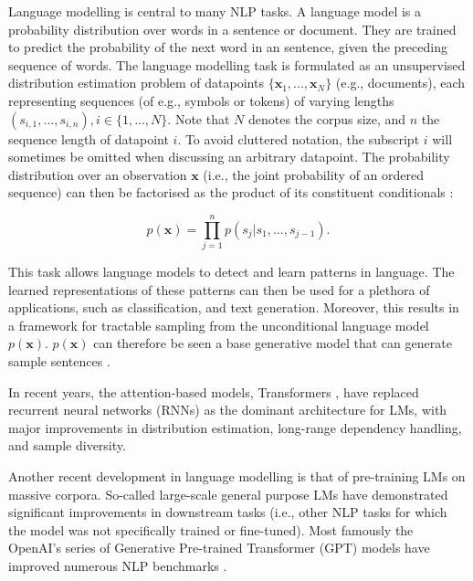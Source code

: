 Language modelling is central to many NLP tasks. A language model is a probability distribution over words in a sentence or document. They are trained to predict the probability of the next word in an sentence, given the preceding sequence of words. The language modelling task is formulated as an unsupervised distribution estimation problem of datapoints $\{\textbf{x}_1, ..., \textbf{x}_N\}$ (e.g., documents), each representing sequences (of e.g., symbols or tokens) of varying lengths $(s_{i, 1}, ..., s_{i, n}), i \in \{1, ..., N\}$. Note that $N$ denotes the corpus size, and $n$ the sequence length of datapoint $i$. To avoid cluttered notation, the subscript $i$ will sometimes be omitted when discussing an arbitrary datapoint. The probability distribution over an observation $\textbf{x}$  (i.e., the joint probability of an ordered sequence) can then be factorised as the product of its constituent conditionals \citep{radford2019language}:

\begin{equation}
    p(\textbf{x}) = \prod_{j = 1}^n  p(s_j | s_1, ..., s_{j - 1}).
\end{equation}

This task allows language models to detect and learn patterns in language. The learned representations of these patterns can then be used for a plethora of applications, such as classification, and text generation. Moreover, this results in a framework for tractable sampling from the unconditional language model $p(\textbf{x})$. $p(\textbf{x})$ can therefore be seen a base generative model that can generate sample sentences \citep{dathathri2019plug}.

In recent years, the attention-based models, Transformers \citep{vaswani2017attention}, have replaced recurrent neural networks (RNNs) as the dominant architecture for LMs, with major improvements in distribution estimation, long-range dependency handling, and sample diversity.

Another recent development in language modelling is that of pre-training LMs on massive corpora. So-called large-scale general purpose LMs have demonstrated significant improvements in downstream tasks (i.e., other NLP tasks for which the model was not specifically trained or fine-tuned). Most famously the OpenAI's series of Generative Pre-trained Transformer (GPT) models have improved numerous NLP benchmarks \citep{radford2018improving,radford2019language, brown2020language}. 



